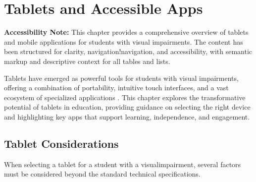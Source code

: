 \chapter{Tablets and Accessible Apps}\label{ch2:tablets}

\begin{raggedright}
	\textbf{Accessibility Note:} This chapter provides a comprehensive overview of tablets and mobile applications for students with visual impairments. The content has been structured for clarity, navigation!navigation, and accessibility, with semantic markup and descriptive context for all tables and lists.
\end{raggedright}

Tablets have emerged as powerful tools for students with visual impairments, offering a combination of portability, intuitive touch interfaces, and a vast ecosystem of specialized applications \supercite{Day2021, Kelly2011}. This chapter explores the transformative potential of tablets in education, providing guidance on selecting the right device and highlighting key apps that support learning, independence, and engagement.

\section{Tablet Considerations}\label{ch2:sec:tablet-considerations}

When selecting a \gls{tablet} for a student with a \gls{visualimpairment}, several factors must be considered beyond the standard technical specifications.

